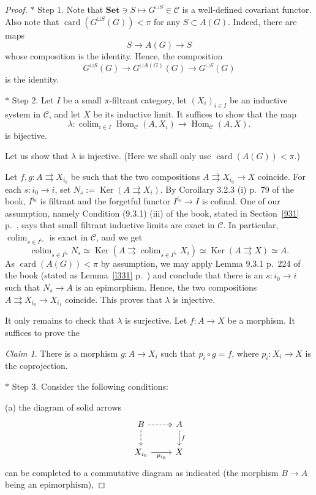 \documentclass[12pt]{article}%
\theoremstyle{remark}
\newtheorem{claim}[thm]{Claim}
\theoremstyle{definition}
\newcommand{\nn}{\noindent}
\newcommand{\C}{\mathcal C}
\newcommand{\Set}{\mathbf{Set}}%
\newcommand{\parar}{\rightrightarrows}
\DeclareMathOperator*{\colim}{colim}%
\DeclareMathOperator{\card}{card}%
\DeclareMathOperator{\Hom}{Hom}%
\DeclareMathOperator{\Ker}{Ker}
\begin{document}
\begin{proof}
$*$ Step 1. Note that $\Set\ni S\mapsto G^{\sqcup S}\in\C$ is a well-defined covariant functor. Also note that $\card(G^{\sqcup S}(G))<\pi$ for any $S\subset A(G)$. Indeed, there are maps 
$$S\to A(G)\to S$$ 
whose composition is the identity. Hence, the composition 
$$G^{\sqcup S}(G)\to G^{\sqcup A(G)}(G)\to G^{\sqcup S}(G)$$ 
is the identity.

\nn$*$ Step 2. Let $I$ be a small $\pi$-filtrant category, let $(X_i)_{i\in I}$ be an inductive system in $\C$, and let $X$ be its inductive limit. It suffices to show that the map 
$$
\lambda:\colim_{i\in I}\Hom_\C(A,X_i)\to\Hom_\C(A,X).
$$ 
is bijective. 

Let us show that $\lambda$ is injective. (Here we shall only use $\card(A(G))<\pi$.)

Let $f,g:A\parar X_{i_0}$ be such that the two compositions $A\parar X_{i_0}\to X$ coincide. For each $s:i_0\to i$, set $N_s:=\Ker(A\parar X_i)$. By Corollary 3.2.3 (i) p.~79 of the book, $I^{i_0}$ is filtrant and the forgetful functor $I^{i_0}\to I$ is cofinal. One of our assumption, namely Condition (9.3.1) (iii) of the book, stated in Section~\ref{931} p.~\pageref{931}, says that small filtrant inductive limits are exact in $\C$. In particular, $\colim_{s\in I^{i_0}}$ is exact in $\C$, and we get  
$$
\colim_{s\in I^{i_0}}N_s\simeq\Ker\left(A\parar\colim_{s\in I^{i_0}}X_i\right)\simeq\Ker(A\parar X)\simeq A.
$$ 
As $\card(A(G))<\pi$ by assumption, we may apply Lemma 9.3.1 p.~224 of the book (stated as Lemma~\ref{l331} p.~\pageref{l331}) and conclude that there is an $s:i_0\to i$ such that $N_s\to A$ is an epimorphism. Hence, the two compositions $A\parar X_{i_0}\to X_{i_1}$ coincide. This proves that $\lambda$ is injective. 

It only remains to check that $\lambda$ is surjective. Let $f:A\to X$ be a morphism. It suffices to prove the 

\begin{claim}\label{pig=f}
There is a morphism $g:A\to X_i$ such that $p_i\circ g=f$, where $p_i:X_i\to X$ is the coprojection.
\end{claim}  

\nn$*$ Step 3. Consider the following conditions:

\nn(a) the diagram of solid arrows 
$$
\begin{tikzcd}
B\ar[dashed,two heads]{r}\ar[dashed]{d}&A\ar{d}{f}\\ 
X_{i_0}\ar{r}[swap]{p_{i_0}}&X
\end{tikzcd}
$$
can be completed to a commutative diagram as indicated (the morphism $B\to A$ being an epimorphism),


\end{proof}
\end{document}
